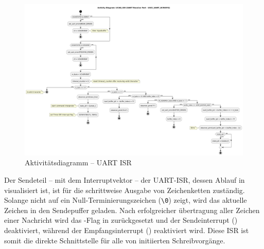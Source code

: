 \newpage
\begin{figure}[h!]
	\centering
	\includegraphics[angle=270, width=1.0\textwidth]{../Bilder/observer_activity_diagram_eusci_receive.png}
	\caption{Aktivit\"atsdiagramm -- UART ISR}
	\label{fig:activity_diagram_uart_isr_rec}
\end{figure}

\newpage
Der Sendeteil -- mit dem Interruptvektor  -- der UART-ISR, dessen Ablauf in  visualisiert ist, ist f\"ur die schrittweise Ausgabe von Zeichenketten zust\"andig. Solange  nicht auf ein Null-Terminierungszeichen (\grq{}\texttt{\textbackslash 0}\grq{}) zeigt, wird das aktuelle Zeichen in den Sendepuffer  geladen. Nach erfolgreicher \"ubertragung aller Zeichen einer Nachricht wird das -Flag in  zur\"uckgesetzt und der Sendeinterrupt () deaktiviert, w\"ahrend der Empfangsinterrupt () reaktiviert wird. Diese ISR ist somit die direkte Schnittstelle f\"ur alle von  initiierten Schreibvorg\"ange.

